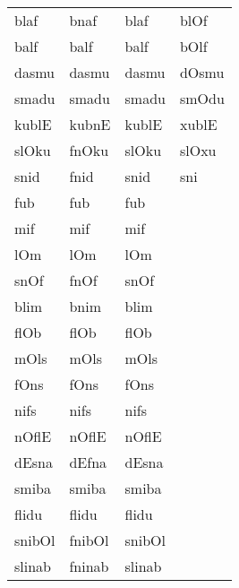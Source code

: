 \begin{appendix}
\begin{table}[!h]
\begin{tabular}[t]{llll}
blaf & bnaf & blaf & blOf\\
balf & balf & balf & bOlf\\
dasmu & dasmu & dasmu & dOsmu\\
smadu & smadu & smadu & smOdu\\
kublE & kubnE & kublE & xublE\\
slOku & fnOku & slOku & slOxu\\
snid & fnid & snid & sni\\
fub & fub & fub & \\
mif & mif & mif & \\
lOm & lOm & lOm & \\
snOf & fnOf & snOf & \\
blim & bnim & blim & \\
flOb & flOb & flOb & \\
mOls & mOls & mOls & \\
fOns & fOns & fOns & \\
nifs & nifs & nifs & \\
nOflE & nOflE & nOflE & \\
dEsna & dEfna & dEsna & \\
smiba & smiba & smiba & \\
flidu & flidu & flidu & \\
snibOl & fnibOl & snibOl & \\
slinab & fninab & slinab & \\
\bottomrule
\end{tabular}
\end{table}
\end{appendix}
